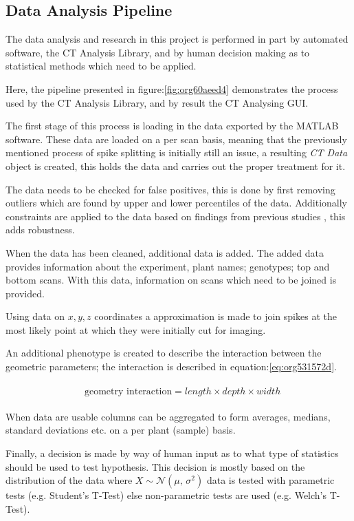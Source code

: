 \documentclass[11pt]{report}
\begin{document}
\subsection{Data Analysis Pipeline}
\label{sec:org8a6b600}
The data analysis and research in this project is performed in part by automated software, the CT Analysis Library, and by human decision making as to statistical methods which need to be applied.

Here, the pipeline presented in figure:\ref{fig:org60aeed4} demonstrates the process used by the CT Analysis Library, and by result the CT Analysing GUI.

The first stage of this process is loading in the data exported by the MATLAB software. These data are loaded on a per scan basis, meaning that the previously mentioned process of spike splitting is initially still an issue, a resulting \emph{CT Data} object is created, this holds the data and carries out the proper treatment for it.

The data needs to be checked for false positives, this is done by first removing outliers which are found by upper and lower percentiles of the data. Additionally constraints are applied to the data based on findings from previous studies \cite{Hughes2017}, this adds robustness.

When the data has been cleaned, additional data is added. The added data provides information about the experiment, plant names; genotypes; top and bottom scans. With this data, information on scans which need to be joined is provided.

Using data on \(x,y,z\) coordinates a approximation is made to join spikes at the most likely point at which they were initially cut for imaging.

An additional phenotype is created to describe the interaction between the geometric parameters; the interaction is described in equation:\ref{eq:org531572d}.

 \begin{align}
\label{eq:org531572d}
   &\begin{aligned}
\text{geometry interaction} = length \times depth \times width
   \end{aligned}
 \end{align}

When data are usable columns can be aggregated to form averages, medians, standard deviations etc. on a per plant (sample) basis.

Finally, a decision is made by way of human input as to what type of statistics should be used to test hypothesis. This decision is mostly based on the distribution of the data where \(X \sim \mathcal{N}(\mu,\,\sigma^{2})\) data is tested with parametric tests (e.g. Student's T-Test) else non-parametric tests are used (e.g. Welch's T-Test).
\end{document}
